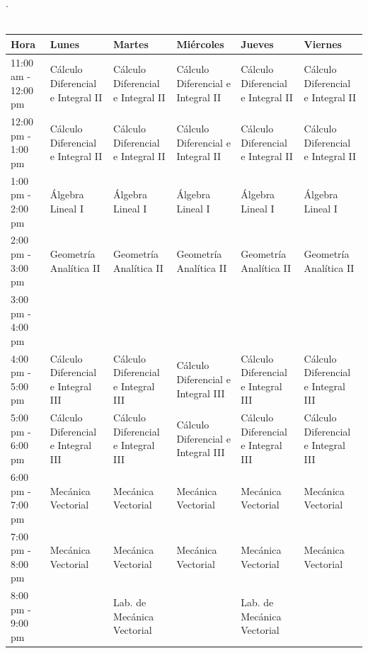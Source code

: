 \documentclass{article}
\begin{document}
\begin{landscape}
\small %
\begin{center}
{. }\\\\
\vspace{3cm}
\begin{tabular}{|m{2.9cm}|m{4.5cm}|m{4.5cm}|m{4.5cm}|m{4.5cm}|m{4.5cm}|}
\hline
Hora & Lunes & Martes & Miércoles & Jueves & Viernes \\
\hline
11:00 am - 12:00 pm & Cálculo Diferencial e Integral II & Cálculo Diferencial e Integral II & Cálculo Diferencial e Integral II & Cálculo Diferencial e Integral II & Cálculo Diferencial e Integral II \\
12:00 pm - 1:00 pm & Cálculo Diferencial e Integral II & Cálculo Diferencial e Integral II & Cálculo Diferencial e Integral II & Cálculo Diferencial e Integral II & Cálculo Diferencial e Integral II \\
1:00 pm - 2:00 pm & Álgebra Lineal I & Álgebra Lineal I & Álgebra Lineal I & Álgebra Lineal I & Álgebra Lineal I \\
2:00 pm - 3:00 pm & Geometría Analítica II & Geometría Analítica II & Geometría Analítica II & Geometría Analítica II & Geometría Analítica II\\
3:00 pm - 4:00 pm &  &  &  &  &  \\
4:00 pm - 5:00 pm & Cálculo Diferencial e Integral III & Cálculo Diferencial e Integral III & Cálculo Diferencial e Integral III & Cálculo Diferencial e Integral III & Cálculo Diferencial e Integral III \\
5:00 pm - 6:00 pm & Cálculo Diferencial e Integral III & Cálculo Diferencial e Integral III & Cálculo Diferencial e Integral III & Cálculo Diferencial e Integral III & Cálculo Diferencial e Integral III \\
6:00 pm - 7:00 pm & Mecánica Vectorial & Mecánica Vectorial & Mecánica Vectorial & Mecánica Vectorial & Mecánica Vectorial \\
7:00 pm - 8:00 pm & Mecánica Vectorial & Mecánica Vectorial & Mecánica Vectorial & Mecánica Vectorial & Mecánica Vectorial \\
8:00 pm - 9:00 pm & & Lab. de Mecánica Vectorial & & Lab. de Mecánica Vectorial & \\
\hline
\end{tabular}\\
\vspace{1cm}
\begin{tabular}{|m{6cm}|m{6cm}|}
\hline

\end{tabular}
\end{center}
\end{landscape}
\end{document}
